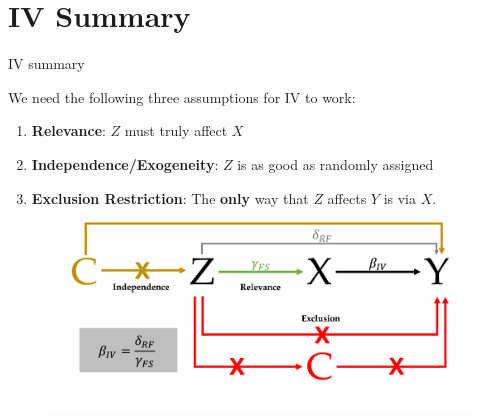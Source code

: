\documentclass[11pt,xcolor=table]{beamer}
\begin{document}
\section{IV Summary}



\begin{frame}{IV summary}

We need the following three assumptions for IV to work: 
    \begin{enumerate}
    \item \textbf{Relevance}: $Z$ must truly affect $X$
    \item \textbf{Independence/Exogeneity}: $Z$ is as good as randomly assigned
    \item \textbf{Exclusion Restriction}: The \textbf{only} way that $Z$ affects $Y$ is via $X$.
    \end{enumerate}



    \begin{figure}
 
        \centering
        \includegraphics[width=1\textwidth]{DAGs/iv_summary_full.png}
        \label{fig:iv3}
    \end{figure}
    
   \end{frame}
\end{document}
